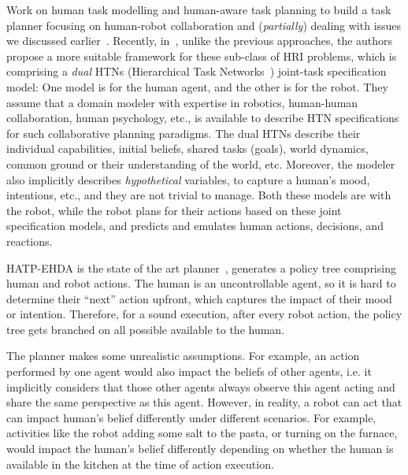 \documentclass[letterpaper]{article} %
\begin{document}
Work on human task modelling and human-aware task planning to build a task planner focusing on human-robot collaboration and (\textit{partially}) dealing with issues we discussed earlier~\cite{alami2006toward,montreuil2007planning,alili2009planning,lallement2014hatp,de2015hatp,lallement2018hatp}.
Recently, in~\cite{BuisanA21,buisan:hal-03684211}, unlike the previous approaches, the authors propose a more suitable framework for these sub-class of HRI problems, which is comprising a \textit{dual} HTNs (Hierarchical Task Networks~\cite{naubooks0014222}) joint-task specification model: One model is for the human agent, and the other is for the robot. 
They assume that a domain modeler with expertise in robotics, human-human collaboration, human psychology, etc., is available to describe HTN specifications for such collaborative planning paradigms. 
The dual HTNs describe their individual capabilities, initial beliefs, shared tasks (goals), world dynamics, common ground or their understanding of the world, etc. Moreover, the modeler also implicitly describes \textit{hypothetical} variables, to capture a human's mood, intentions, etc., and they are not trivial to manage. 
Both these models are with the robot, while the robot plans for their actions based on these joint specification models, and predicts and emulates human actions, decisions, and reactions.    

HATP-EHDA is the state of the art planner~\cite{buisan:hal-03684211}, 
generates a policy tree comprising human and robot actions. 
The human is an uncontrollable agent,
so it is hard to determine their ``next'' action upfront, which captures the impact of their mood or intention.
Therefore, for a sound execution, after every robot action, the policy tree gets branched on all possible  available to the human.

The planner makes some unrealistic assumptions. For example, an action performed by one agent would also impact the beliefs of other agents, i.e. it implicitly considers that those other agents always observe this agent acting and share the same perspective as this agent. However, in reality, a robot can act that can impact human's belief differently under different scenarios. For example, activities like the robot adding some salt to the pasta, or turning on the furnace, would impact the human's belief differently depending on whether the human is available in the kitchen at the time of action execution.   
\end{document}
